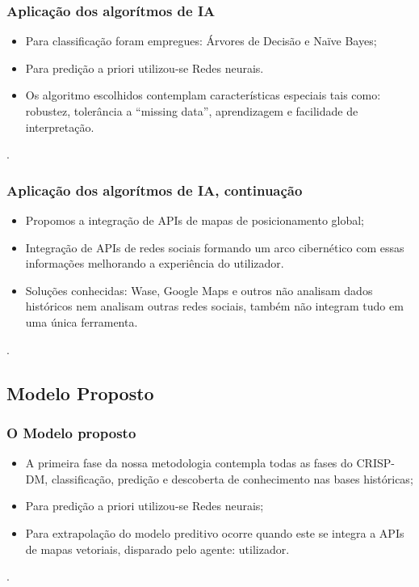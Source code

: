 \documentclass[11pt]{beamer}
\begin{document}
\begin{frame}
	\frametitle{Aplicação dos algorítmos de IA}
	
	\begin{itemize}
		\item Para classificação foram empregues: Árvores de Decisão e Naïve Bayes;
		\pause
		\item Para predição a priori utilizou-se Redes neurais.
		\pause
		\item Os algoritmo escolhidos contemplam características especiais tais como: robustez, tolerância a ``missing data'', aprendizagem e facilidade de interpretação.
	\end{itemize}.
\end{frame}


\begin{frame}
	\frametitle{Aplicação dos algorítmos de IA, continuação}
	\begin{itemize}
		\item Propomos a integração de APIs de mapas de posicionamento global;
		\pause
		\item Integração de APIs de redes sociais formando um arco cibernético com essas informações melhorando a experiência do utilizador.
		\pause
		\item Soluções conhecidas: Wase, Google Maps e outros não analisam dados históricos nem analisam outras redes sociais, também não integram tudo em uma única ferramenta.
	\end{itemize}.
\end{frame}

\subsection{Modelo Proposto}
\begin{frame}
	\frametitle{O Modelo proposto}
	\begin{itemize}
		\item A primeira fase da nossa metodologia contempla todas as fases do CRISP-DM, classificação, predição e descoberta de conhecimento nas bases históricas;
		\pause
		\item Para predição a priori utilizou-se Redes neurais;
		\pause
		\item Para extrapolação do modelo preditivo ocorre quando este se integra a APIs de mapas vetoriais, disparado pelo agente: utilizador.
	\end{itemize}.
\end{frame}
\end{document}
